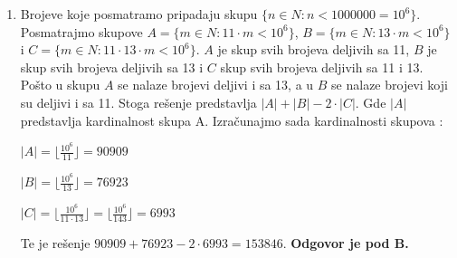 \documentclass[a4paper,12pt]{report}
\begin{document}
\begin{enumerate}[1.]
\item Brojeve koje posmatramo pripadaju skupu $ \{n\in N : n < 1 000 000 = 10^{6}\} $. Posmatrajmo skupove $A = \{ m \in N : 11 \cdot m < 10^{6}\}$, $B = \{ m \in N : 13 \cdot m < 10^{6}\}$ i $C = \{ m \in N : 11 \cdot 13 \cdot m < 10^{6}\}$. $A$ je skup svih brojeva deljivih sa 11, $B$ je skup svih brojeva deljivih sa 13 i $C$ skup svih brojeva deljivih sa 11 i 13. Po\v{s}to u skupu $A$ se nalaze brojevi deljivi i sa 13, a u $B$ se nalaze brojevi koji su deljivi i sa 11. Stoga re\v{s}enje predstavlja $\lvert A \rvert + \lvert B \rvert  - 2 \cdot \lvert C \rvert $. Gde $ \lvert A \rvert $ predstavlja kardinalnost skupa A. Izra\v{c}unajmo sada kardinalnosti skupova :
\par $ \lvert A \rvert = \lfloor \frac{10^{6}}{11}\rfloor   = 90909$  
\par  $ \lvert B \rvert = \lfloor \frac{10^{6}}{13}\rfloor   = 76923$
\par  $ \lvert C \rvert = \lfloor \frac{10^{6}}{11 \cdot 13}\rfloor = \lfloor \frac{10^{6}}{143}\rfloor  = 6993$  
\par Te je re\v{s}enje $ 90909 + 76923 - 2 \cdot 6993  = 153846$. \textbf{Odgovor je pod B.}


\end{enumerate}
\end{document}
